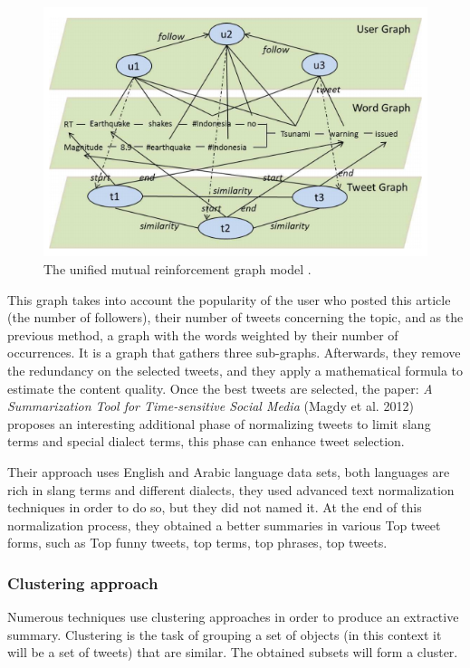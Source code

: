 \documentclass{llncs}
\begin{document}
\begin{figure}[H]
    \includegraphics[width=\textwidth]{fig3.png}
    \caption{The unified mutual reinforcement graph model \cite{duan_twitter_2012}.}
    \label{fig:fig3}
\end{figure}

This graph takes into account the popularity of the user who posted this
article (the number of followers), their number of tweets concerning the topic,
and as the previous method, a graph with the words weighted by their number of
occurrences. It is a graph that gathers three sub-graphs. Afterwards, they
remove the redundancy on the selected tweets, and they apply a mathematical
formula to estimate the content quality. Once the best tweets are selected, the
paper: \textit{A Summarization Tool for Time-sensitive Social Media} (Magdy et
al. 2012)\cite{magdy_summarization_2012} proposes an interesting additional
phase of normalizing tweets to limit slang terms and special dialect terms,
this phase can enhance tweet selection.

Their approach uses English and Arabic language data sets, both languages are
rich in slang terms and different dialects, they used advanced text
normalization techniques in order to do so, but they did not named it. At the
end of this normalization process, they obtained a better summaries in various
Top tweet forms, such as Top funny tweets, top terms, top phrases, top tweets.

\subsubsection{Clustering approach}

Numerous techniques use clustering approaches in order to
produce an extractive summary. Clustering is the task of grouping a set of
objects (in this context it will be a set of tweets) that are similar. The
obtained subsets will form a cluster.
\end{document}
